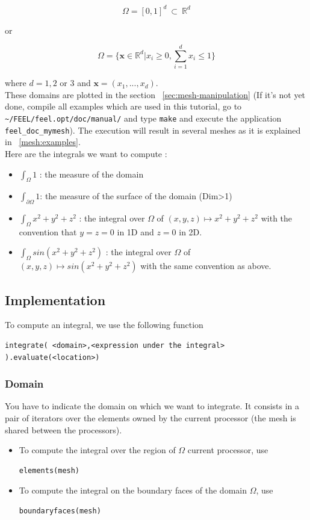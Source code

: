 \[ \Omega=[0,1]^d\ \subset\ \mathbb{R}^d \]

or

\[ \Omega=\{ \mathbf{x} \in \mathbb{R}^d | x_i \geq 0, \sum_{i=1}^{d} x_i \leq 1 \} \]

where $ d=1,2$ or $3$ and $\mathbf{x}=(x_1,...,x_d)$.\\ \newline
These domains are plotted in the section ~\ref{sec:mesh-manipulation} (If it's not yet done, compile all examples which are used in this tutorial, go to \lstinline!~/FEEL/feel.opt/doc/manual/! and type \verb|make| and execute the application \verb|feel_doc_mymesh|). The execution will result in several meshes as it is explained in ~\ref{mesh:examples}.\\
Here are the integrals we want to compute :
\begin{itemize}
\item $\displaystyle{ \int_\Omega 1 }$ : the measure of the domain
\item $\displaystyle{ \int_{\partial\Omega} 1 }$: the measure of the surface of the domain (Dim>1)
\item $ \displaystyle{\int_{\Omega} x^2+y^2+z^2 }$ : the integral over $\displaystyle{\Omega}$ of $ \displaystyle{(x,y,z) \mapsto x^2+y^2+z^2}$ with the convention that $y=z=0$ in 1D and $ z=0 $ in 2D.
\item $\displaystyle{ \int_{\Omega} sin(x^2+y^2+z^2)} $ : the integral over $\Omega$ of $\displaystyle{ (x,y,z) \mapsto sin(x^2+y^2+z^2)}$ with the same convention as above.
\end{itemize}

\subsection{Implementation}

To compute an integral, we use the following function
\begin{lstlisting}
integrate( <domain>,<expression under the integral> ).evaluate(<location>)
\end{lstlisting}

\subsubsection{Domain}

You have to indicate the domain on which we want to integrate. It consists in a pair of iterators over the elements owned by the current processor (the mesh is shared between the processors).
\begin{itemize}
\item To compute the integral over the region of $\Omega$ current processor, use
\begin{lstlisting}
elements(mesh)
\end{lstlisting}
\item To compute the integral on the boundary faces of the domain $\Omega$, use
\begin{lstlisting}
boundaryfaces(mesh)
\end{lstlisting}
\end{itemize}


